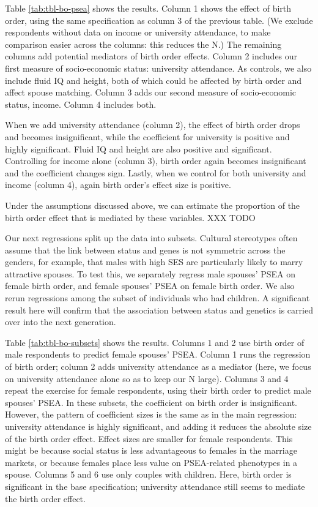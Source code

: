 \documentclass[
]{article}
\begin{document}
Table \ref{tab:tbl-bo-psea} shows the results. Column 1 shows the
effect of birth order, using the same specification as column 3 of the
previous table. (We exclude respondents without data on income or
university attendance, to make comparison easier across the columns:
this reduces the N.) The remaining columns add potential mediators of
birth order effects. Column 2 includes our first measure of
socio-economic status: university attendance. As controls, we also
include fluid IQ and height, both of which could be affected by birth
order and affect spouse matching. Column 3 adds our second measure of
socio-economic status, income. Column 4 includes both.

When we add university attendance (column 2), the effect of birth order
drops and becomes insignificant, while the coefficient for university is
positive and highly significant. Fluid IQ and height are also positive
and significant. Controlling for income alone (column 3), birth order
again becomes insignificant and the coefficient changes sign. Lastly,
when we control for both university and income (column 4), again birth
order's effect size is positive.

Under the assumptions discussed above, we can estimate the proportion of
the birth order effect that is mediated by these variables. XXX TODO

Our next regressions split up the data into subsets. Cultural
stereotypes often assume that the link between status and genes is not
symmetric across the genders, for example, that males with high SES are
particularly likely to marry attractive spouses. To test this, we
separately regress male spouses' PSEA on female birth order, and female
spouses' PSEA on female birth order. We also rerun regressions among the
subset of individuals who had children. A significant result here will
confirm that the association between status and genetics is carried over
into the next generation.

Table \ref{tab:tbl-bo-subsets} shows the results. Columns 1 and 2 use
birth order of male respondents to predict female spouses' PSEA. Column
1 runs the regression of birth order; column 2 adds university
attendance as a mediator (here, we focus on university attendance alone
so as to keep our N large). Columns 3 and 4 repeat the exercise for
female respondents, using their birth order to predict male spouses'
PSEA. In these subsets, the coefficient on birth order is insignificant.
However, the pattern of coefficient sizes is the same as in the main
regression: university attendance is highly significant, and adding it
reduces the absolute size of the birth order effect. Effect sizes are
smaller for female respondents. This might be because social status is
less advantageous to females in the marriage markets, or because females
place less value on PSEA-related phenotypes in a spouse. Columns 5 and 6
use only couples with children. Here, birth order is significant in the
base specification; university attendance still seems to mediate the
birth order effect.
\end{document}
